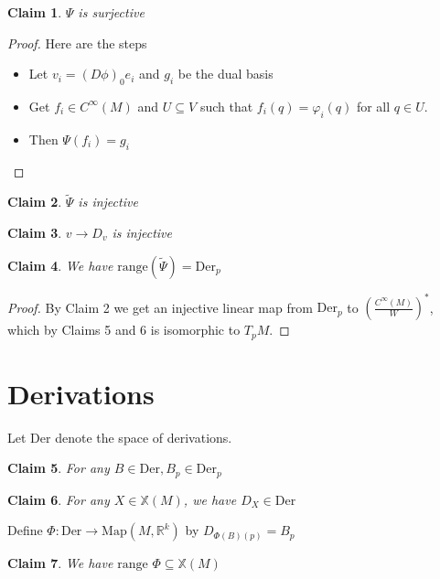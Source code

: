 \documentclass{article}
\newtheorem{claim}{Claim}
\begin{document}
\begin{claim}
    $\Psi$ is surjective
\end{claim}

\begin{proof} Here are the steps
    
    \begin{itemize}
        \item Let $v_i = (D\phi)_0 e_i$ and $g_i$ be the dual basis
        \item Get $f_i \in C^\infty(M)$ and $U \subseteq V$ such that $f_i(q)=\varphi_i(q)$ for all $q \in U$.
        \item Then $\Psi(f_i)=g_i$
    \end{itemize}
      
\end{proof}

\begin{claim}
    $\tilde{\Psi}$ is injective
\end{claim}

\begin{claim}
    $v \to D_v$ is injective
\end{claim}

\begin{claim}
    We have $\text{range}(\tilde{\Psi})=\text{Der}_p$
\end{claim}

\begin{proof}
    By Claim 2 we get an injective linear map from $\text{Der}_p$ to $\left (\frac {C^\infty(M)}{W} \right) ^*$, which by Claims 5 and 6 is isomorphic to $T_pM$.
\end{proof}

\section{Derivations}

Let $\text{Der}$ denote the space of derivations.

\begin{claim}
    For any $B \in \text{Der}, B_p \in \text{Der}_p$
\end{claim}

\begin{claim}
    For any $X \in \mathbb{X}(M)$, we have $D_X \in \text{Der}$
\end{claim}

Define $\Phi: \text{Der} \to \text{Map}(M,\mathbb{R}^k)$ by $D_{\Phi(B)(p)} = B_p$

\begin{claim}
    We have $\text{range } \Phi \subseteq \mathbb{X}(M)$
\end{claim}
\end{document}
